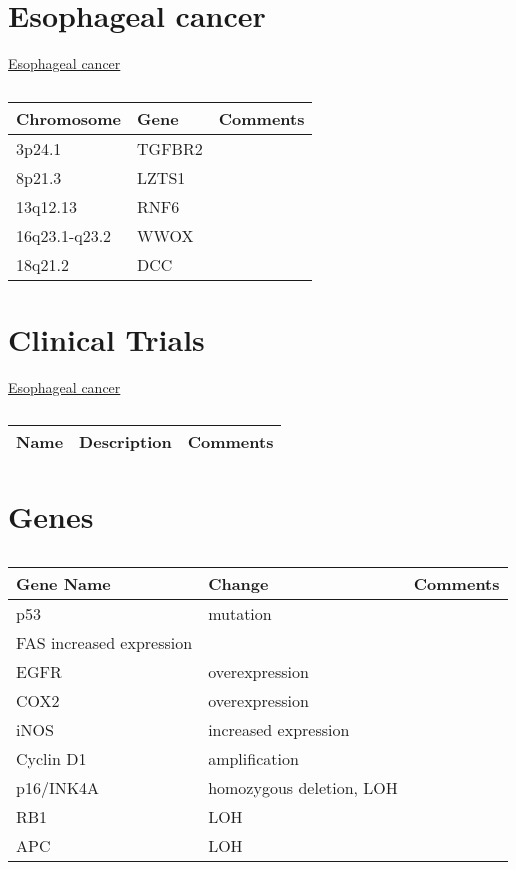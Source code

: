 
\section{Esophageal cancer}

\href{https://www.omim.org/entry/133239?search=Esophageal%20cancer&highlight=%28cancer%7Ccancerous%29%20esophageal}{Esophageal cancer}

\begin{table}[H]\centering
  \caption {\cite{key450}}
	\begin{tabular}{p{1cm}p{4cm}p{3cm}}
		Chromosome & Gene & Comments\\
		\hline
3p24.1 & TGFBR2 & \\	
8p21.3 &  LZTS1 & \\
13q12.13 & RNF6 & \\	
16q23.1-q23.2 & WWOX & \\ 	
18q21.2 & DCC & \\
		\hline
	\end{tabular}
\end{table}


\section{Clinical Trials}

\href{https://clinicaltrials.gov/ct2/results?cond=Esophageal+cancer&term=&cntry=&state=&city=&dist=}{Esophageal cancer}

\begin{table}[H]\centering
  \caption {\cite{key450}}
	\begin{tabular}{p{1cm}p{4cm}p{3cm}}
		Name & Description & Comments\\
		\hline
		\hline
	\end{tabular}
\end{table}

\section{Genes}

\begin{table}[H]\centering
  \caption {\cite{key400}}
	\begin{tabular}{p{1cm}p{4cm}p{3cm}}
		Gene Name & Change & Comments\\
		\hline
    p53  & mutation & \\
    FAS increased expression & \\
    EGFR & overexpression & \\
    COX2 & overexpression &  \\
    iNOS & increased expression & \\
    Cyclin D1 & amplification & \\
    p16/INK4A & homozygous deletion, LOH & \\
    RB1  & LOH & \\
    APC  & LOH & \\
		\hline
	\end{tabular}
\end{table}


